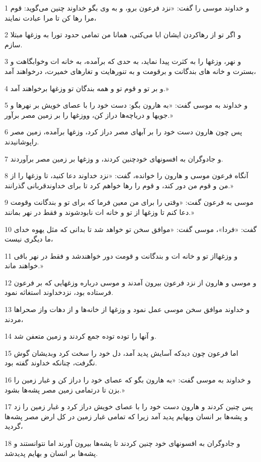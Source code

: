 \par 1 و خداوند موسی را گفت: «نزد فرعون برو، و به وی بگو خداوند چنین می‌گوید: قوم مرا رها کن تا مرا عبادت نمایند،
\par 2 و اگر تو از رهاکردن ایشان ابا می‌کنی، همانا من تمامی حدود تورا به وزغها مبتلا سازم.
\par 3 و نهر، وزغها را به کثرت پیدا نماید، به حدی که برآمده، به خانه ات وخوابگاهت و بسترت و خانه های بندگانت و برقومت و به تنورهایت و تغارهای خمیرت، درخواهند آمد،
\par 4 و بر تو و قوم تو و همه بندگان تو وزغها برخواهند آمد.»
\par 5 و خداوند به موسی گفت: «به هارون بگو: دست خود را با عصای خویش بر نهرها و جویها و دریاچه‌ها دراز کن، ووزغها را بر زمین مصر برآور.»
\par 6 پس چون هارون دست خود را بر آبهای مصر دراز کرد، وزغها برآمده، زمین مصر راپوشانیدند.
\par 7 و جادوگران به افسونهای خودچنین کردند، و وزغها بر زمین مصر برآوردند.
\par 8 آنگاه فرعون موسی و هارون را خوانده، گفت: «نزد خداوند دعا کنید، تا وزغها را از من و قوم من دور کند، و قوم را رها خواهم کرد تا برای خداوندقربانی گذرانند.»
\par 9 موسی به فرعون گفت: «وقتی را برای من معین فرما که برای تو و بندگانت وقومت دعا کنم تا وزغها از تو و خانه ات نابودشوند و فقط در نهر بمانند.»
\par 10 گفت: «فردا»، موسی گفت: «موافق سخن تو خواهد شد تا بدانی که مثل یهوه خدای ما دیگری نیست،
\par 11 و وزغهااز تو و خانه ات و بندگانت و قومت دور خواهندشد و فقط در نهر باقی خواهند ماند.»
\par 12 و موسی و هارون از نزد فرعون بیرون آمدند و موسی درباره وزغهایی که بر فرعون فرستاده بود، نزدخداوند استغاثه نمود.
\par 13 و خداوند موافق سخن موسی عمل نمود و وزغها از خانه‌ها و از دهات واز صحراها مردند،
\par 14 و آنها را توده توده جمع کردند و زمین متعفن شد.
\par 15 اما فرعون چون دیدکه آسایش پدید آمد، دل خود را سخت کرد وبدیشان گوش نگرفت، چنانکه خداوند گفته بود.
\par 16 و خداوند به موسی گفت: «به هارون بگو که عصای خود را دراز کن و غبار زمین را بزن تا درتمامی زمین مصر پشه‌ها بشود.»
\par 17 پس چنین کردند و هارون دست خود را با عصای خویش دراز کرد و غبار زمین را زد و پشه‌ها بر انسان وبهایم پدید آمد زیرا که تمامی غبار زمین در کل ارض مصر پشه‌ها گردید،
\par 18 و جادوگران به افسونهای خود چنین کردند تا پشه‌ها بیرون آورند اما نتوانستند و پشه‌ها بر انسان و بهایم پدیدشد.
